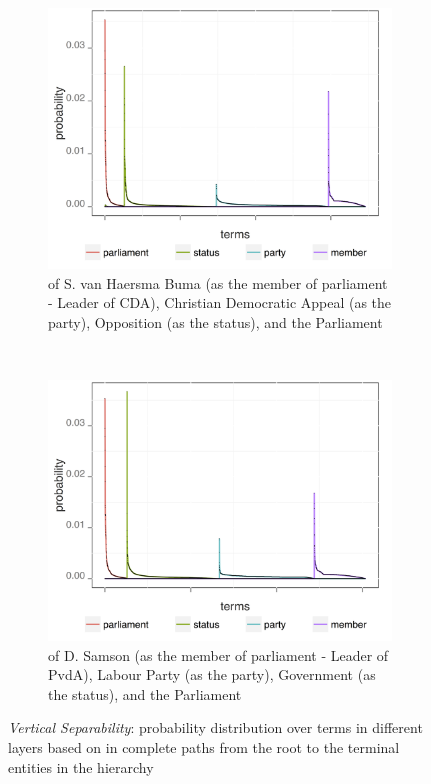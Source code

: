 \begin{figure}[!t]
        \centering
        \begin{subfigure}[b]{0.45\textwidth}
\includegraphics[width=\linewidth]{02-part-01/chapter-03/figs_and_tables/img_nlm02316.png}
\caption{\label{fig:VSO} \achswlm of S. van Haersma Buma (as the member of parliament - Leader of CDA), Christian Democratic Appeal (as the party), Opposition (as the status), and the Parliament}
        \end{subfigure}
        ~~~~~~~~
        \begin{subfigure}[b]{0.45\textwidth}
\centering
\includegraphics[width=\linewidth]{02-part-01/chapter-03/figs_and_tables/img_nlm02335.png}
\caption{\label{fig:VSC} \achswlm of D. Samson (as the member of parliament - Leader of PvdA), Labour Party (as the party), Government (as the status), and the Parliament}
        \end{subfigure}
        \caption{\label{fig:VS} \emph{Vertical Separability}: probability distribution over terms in different layers based on \hswlms in complete paths from the root to the terminal entities in the hierarchy}
\end{figure}

